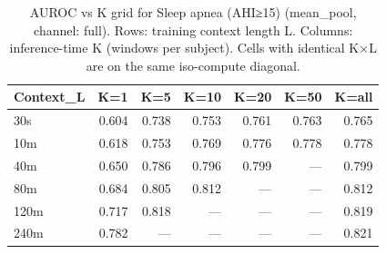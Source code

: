 \begin{table}[ht]
\centering
\caption{AUROC vs K grid for Sleep apnea (AHI≥15) (mean_pool, channel: full). Rows: training context length L. Columns: inference-time K (windows per subject). Cells with identical K×L are on the same iso-compute diagonal.}
\label{tab:kgrid_apnea_binary_mean_pool_full}
\begin{tabular}{lrrrrrr}
\toprule
Context_L & K=1 & K=5 & K=10 & K=20 & K=50 & K=all \\
\midrule
30s & 0.604 & 0.738 & 0.753 & 0.761 & 0.763 & 0.765 \\
10m & 0.618 & 0.753 & 0.769 & 0.776 & 0.778 & 0.778 \\
40m & 0.650 & 0.786 & 0.796 & 0.799 & — & 0.799 \\
80m & 0.684 & 0.805 & 0.812 & — & — & 0.812 \\
120m & 0.717 & 0.818 & — & — & — & 0.819 \\
240m & 0.782 & — & — & — & — & 0.821 \\
\bottomrule
\end{tabular}
\end{table}